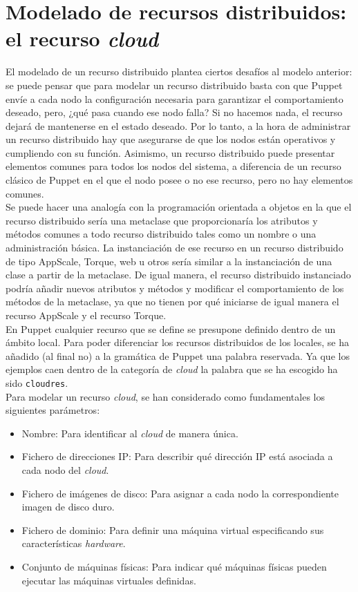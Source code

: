 \section{Modelado de recursos distribuidos: el recurso \emph{cloud}}

El modelado de un recurso distribuido plantea ciertos desafíos al modelo anterior: se puede pensar que para modelar un recurso distribuido basta con que Puppet envíe a cada nodo la configuración necesaria para garantizar el comportamiento deseado, pero, ¿qué pasa cuando ese nodo falla? Si no hacemos nada, el recurso dejará de mantenerse en el estado deseado. Por lo tanto, a la hora de administrar un recurso distribuido hay que asegurarse de que los nodos están operativos y cumpliendo con su función. Asimismo, un recurso distribuido puede presentar elementos comunes para todos los nodos del sistema, a diferencia de un recurso clásico de Puppet en el que el nodo posee o no ese recurso, pero no hay elementos comunes.\\

Se puede hacer una analogía con la programación orientada a objetos en la que el recurso distribuido sería una metaclase que proporcionaría los atributos y métodos comunes a todo recurso distribuido tales como un nombre o una administración básica. La instanciación de ese recurso en un recurso distribuido de tipo AppScale, Torque, web u otros sería similar a la instanciación de una clase a partir de la metaclase. De igual manera, el recurso distribuido instanciado podría añadir nuevos atributos y métodos y modificar el comportamiento de los métodos de la metaclase, ya que no tienen por qué iniciarse de igual manera el recurso AppScale y el recurso Torque.\\

En Puppet cualquier recurso que se define se presupone definido dentro de un ámbito local. Para poder diferenciar los recursos distribuidos de los locales, se ha añadido (al final no) a la gramática de Puppet una palabra reservada. Ya que los ejemplos caen dentro de la categoría de \emph{cloud} la palabra que se ha escogido ha sido \texttt{cloudres}.\\

Para modelar un recurso \emph{cloud}, se han considerado como fundamentales los siguientes parámetros:

\begin{itemize}
\item Nombre: Para identificar al \emph{cloud} de manera única.
\item Fichero de direcciones IP: Para describir qué dirección IP está asociada a cada nodo del \emph{cloud}.
\item Fichero de imágenes de disco: Para asignar a cada nodo la correspondiente imagen de disco duro.
\item Fichero de dominio: Para definir una máquina virtual especificando sus características \emph{hardware}.
\item Conjunto de máquinas físicas: Para indicar qué máquinas físicas pueden ejecutar las máquinas virtuales definidas.
\end{itemize}

